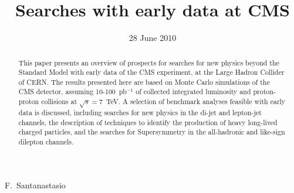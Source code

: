 \documentclass{cmspaper}
\begin{document}

\begin{titlepage}

   \date{28 June 2010}

  \title{Searches with early data at CMS}
  \begin{Authlist}
    F.~Santanastasio
  \end{Authlist}




  \begin{abstract}
    This paper presents an overview of prospects for searches for new physics 
    beyond the Standard Model with early data of the CMS experiment, at the Large Hadron Collider of CERN. 
    The results presented here are based on Monte Carlo simulations of the 
    CMS detector, assuming 10-100~pb$^{-1}$ of collected integrated 
    luminosity and proton-proton collisions at $\sqrt{s} = 7$~TeV. 
    A selection of benchmark analyses feasible with early data is discussed,  
    including searches for new physics in the di-jet and lepton-jet channels, 
    the description of techniques to identify the production of heavy long-lived charged particles, 
    and the searches for Supersymmetry in the all-hadronic and like-sign dilepton channels.
  \end{abstract} 


  
\end{titlepage}

\setcounter{page}{1}%
\end{document}
